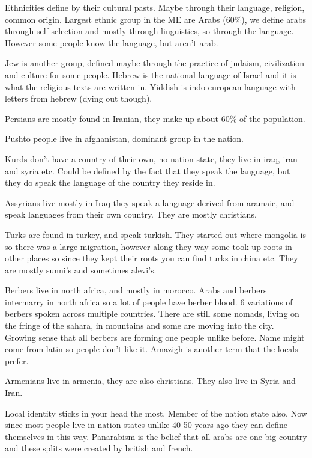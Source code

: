 \documentclass[12pt]{article}
\begin{document}
Ethnicities define by their cultural pasts. Maybe through their language, religion, common origin. Largest ethnic group in the ME are Arabs (60\%), we define arabs through self selection and mostly through linguistics, so through the language. However some people know the language, but aren't arab. 

Jew is another group, defined maybe through the practice of judaism, civilization and culture for some people. Hebrew is the national language of Israel and it is what the religious texts are written in. Yiddish is indo-european language with letters from hebrew (dying out though).

Persians are mostly found in Iranian, they make up about 60\% of the population. 

Pushto people live in afghanistan, dominant group in the nation. 

Kurds don't have a country of their own, no nation state, they live in iraq, iran and syria etc. Could be defined by the fact that they speak the language, but they do speak the language of the country they reside in.

Assyrians live mostly in Iraq they speak a language derived from aramaic, and speak languages from their own country. They are mostly christians. 

Turks are found in turkey, and speak turkish. They started out where mongolia is so there was a large migration, however along they way some took up roots in other places so since they kept their roots you can find turks in china etc. They are mostly sunni's and sometimes alevi's. 

Berbers live in north africa, and mostly in morocco. Arabs and berbers intermarry in north africa so a lot of people have berber blood. 6 variations of berbers spoken across multiple countries. There are still some nomads, living on the fringe of the sahara, in mountains and some are moving into the city. Growing sense that all berbers are forming one people unlike before. Name might come from latin so people don't like it. Amazigh is another term that the locals prefer. 

Armenians live in armenia, they are also christians. They also live in Syria and Iran. 

Local identity sticks in your head the most. Member of the nation state also. Now since most people live in nation states unlike 40-50 years ago they can define themselves in this way. Panarabism is the belief that all arabs are one big country and these splits were created by british and french. 
\end{document}
